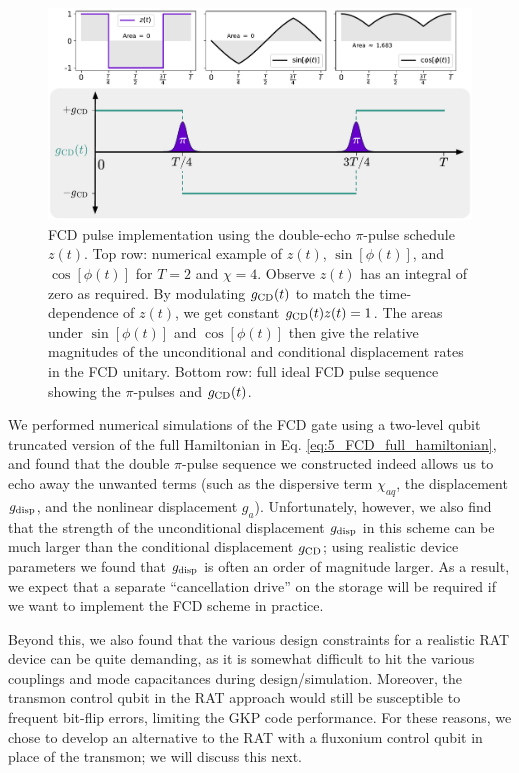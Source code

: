 \begin{figure}[t]
    \centering
    \includegraphics[width=\linewidth]{Figures/5/double_echo_FCD.pdf}
    \caption{FCD pulse implementation using the double-echo $\pi$-pulse schedule $z(t)$. Top row: numerical example of $z(t)$, $\sin[\phi(t)]$, and $\cos[\phi(t)]$ for $T = 2$ and $\chi = 4$. Observe $z(t)$ has an integral of zero as required. By modulating $g_{\rm CD}(t)$ to match the time-dependence of $z(t)$, we get constant $g_{\rm CD}(t)z(t) = 1$. The areas under $\sin[\phi(t)]$ and $\cos[\phi(t)]$ then give the relative magnitudes of the unconditional and conditional displacement rates in the FCD unitary. Bottom row: full ideal FCD pulse sequence showing the $\pi$-pulses and $g_{\rm CD}(t)$.}
    \label{fig:5_double_echo_FCD}
\end{figure}

We performed numerical simulations of the FCD gate using a two-level qubit truncated version of the full Hamiltonian in Eq. \eqref{eq:5_FCD_full_hamiltonian}, and found that the double $\pi$-pulse sequence we constructed indeed allows us to echo away the unwanted terms (such as the dispersive term $\chi_{aq}$, the displacement $g_{\rm disp}$, and the nonlinear displacement $g_a$). Unfortunately, however, we also find that the strength of the unconditional displacement $g_{\rm disp}$ in this scheme can be much larger than the conditional displacement $g_{\rm CD}$; using realistic device parameters we found that $g_{\rm disp}$ is often an order of magnitude larger. As a result, we expect that a separate ``cancellation drive'' on the storage will be required if we want to implement the FCD scheme in practice. 

Beyond this, we also found that the various design constraints for a realistic RAT device can be quite demanding, as it is somewhat difficult to hit the various couplings and mode capacitances during design/simulation. Moreover, the transmon control qubit in the RAT approach would still be susceptible to frequent bit-flip errors, limiting the GKP code performance. For these reasons, we chose to develop an alternative to the RAT with a fluxonium control qubit in place of the transmon; we will discuss this next. 

